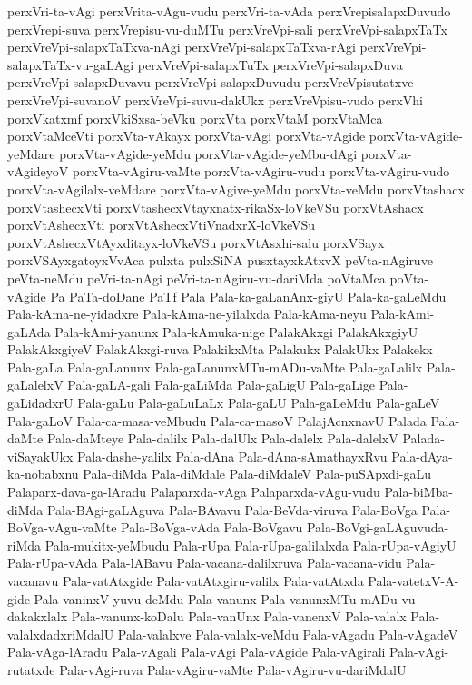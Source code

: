 {perxVri-ta-vAgi
perxVrita-vAgu-vudu
perxVri-ta-vAda
perxVrepisalapxDuvudo
perxVrepi-suva
perxVrepisu-vu-duMTu
perxVreVpi-sali
perxVreVpi-salapxTaTx
perxVreVpi-salapxTaTxva-nAgi
perxVreVpi-salapxTaTxva-rAgi
perxVreVpi-salapxTaTx-vu-gaLAgi
perxVreVpi-salapxTuTx
perxVreVpi-salapxDuva
perxVreVpi-salapxDuvavu
perxVreVpi-salapxDuvudu
perxVreVpisutatxve
perxVreVpi-suvanoV
perxVreVpi-suvu-dakUkx
perxVreVpisu-vudo
perxVhi
porxVkatxmf
porxVkiSxsa-beVku
porxVta
porxVtaM
porxVtaMca
porxVtaMceVti
porxVta-vAkayx
porxVta-vAgi
porxVta-vAgide
porxVta-vAgide-yeMdare
porxVta-vAgide-yeMdu
porxVta-vAgide-yeMbu-dAgi
porxVta-vAgideyoV
porxVta-vAgiru-vaMte
porxVta-vAgiru-vudu
porxVta-vAgiru-vudo
porxVta-vAgilalx-veMdare
porxVta-vAgive-yeMdu
porxVta-veMdu
porxVtashacx
porxVtashecxVti
porxVtashecxVtayxnatx-rikaSx-loVkeVSu
porxVtAshacx
porxVtAshecxVti
porxVtAshecxVtiVnadxrX-loVkeVSu
porxVtAshecxVtAyxditayx-loVkeVSu
porxVtAsxhi-salu
porxVSayx
porxVSAyxgatoyxVvAca
pulxta
pulxSiNA
pusxtayxkAtxvX
peVta-nAgiruve
peVta-neMdu
peVri-ta-nAgi
peVri-ta-nAgiru-vu-dariMda
poVtaMca
poVta-vAgide
Pa
PaTa-doDane
PaTf
Pala
Pala-ka-gaLanAnx-giyU
Pala-ka-gaLeMdu
Pala-kAma-ne-yidadxre
Pala-kAma-ne-yilalxda
Pala-kAma-neyu
Pala-kAmi-gaLAda
Pala-kAmi-yanunx
Pala-kAmuka-nige
PalakAkxgi
PalakAkxgiyU
PalakAkxgiyeV
PalakAkxgi-ruva
PalakikxMta
Palakukx
PalakUkx
Palakekx
Pala-gaLa
Pala-gaLanunx
Pala-gaLanunxMTu-mADu-vaMte
Pala-gaLalilx
Pala-gaLalelxV
Pala-gaLA-gali
Pala-gaLiMda
Pala-gaLigU
Pala-gaLige
Pala-gaLidadxrU
Pala-gaLu
Pala-gaLuLaLx
Pala-gaLU
Pala-gaLeMdu
Pala-gaLeV
Pala-gaLoV
Pala-ca-masa-veMbudu
Pala-ca-masoV
PalajAcnxnavU
Palada
Pala-daMte
Pala-daMteye
Pala-dalilx
Pala-dalUlx
Pala-dalelx
Pala-dalelxV
Palada-viSayakUkx
Pala-dashe-yalilx
Pala-dAna
Pala-dAna-sAmathayxRvu
Pala-dAya-ka-nobabxnu
Pala-diMda
Pala-diMdale
Pala-diMdaleV
Pala-puSApxdi-gaLu
Palaparx-dava-ga-lAradu
Palaparxda-vAga
Palaparxda-vAgu-vudu
Pala-biMba-diMda
Pala-BAgi-gaLAguva
Pala-BAvavu
Pala-BeVda-viruva
Pala-BoVga
Pala-BoVga-vAgu-vaMte
Pala-BoVga-vAda
Pala-BoVgavu
Pala-BoVgi-gaLAguvuda-riMda
Pala-mukitx-yeMbudu
Pala-rUpa
Pala-rUpa-galilalxda
Pala-rUpa-vAgiyU
Pala-rUpa-vAda
Pala-lABavu
Pala-vacana-dalilxruva
Pala-vacana-vidu
Pala-vacanavu
Pala-vatAtxgide
Pala-vatAtxgiru-valilx
Pala-vatAtxda
Pala-vatetxV-A-gide
Pala-vaninxV-yuvu-deMdu
Pala-vanunx
Pala-vanunxMTu-mADu-vu-dakakxlalx
Pala-vanunx-koDalu
Pala-vanUnx
Pala-vanenxV
Pala-valalx
Pala-valalxdadxriMdalU
Pala-valalxve
Pala-valalx-veMdu
Pala-vAgadu
Pala-vAgadeV
Pala-vAga-lAradu
Pala-vAgali
Pala-vAgi
Pala-vAgide
Pala-vAgirali
Pala-vAgi-rutatxde
Pala-vAgi-ruva
Pala-vAgiru-vaMte
Pala-vAgiru-vu-dariMdalU
}
